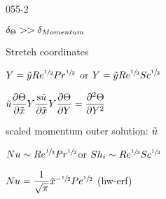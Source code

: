 \begin{mitframe}{055-2}
\begin{listone}
	\item $\blthick_{\dimltemp}>>\blthick_{Momentum}$
    \item Stretch coordinates
    	\begin{listtwo}
        	\item $Y=\tilde{y}\reynolds^{\sfrac{1}{2}}\prandtl^{\sfrac{1}{3}}$ or $Y=\tilde{y}\reynolds^{\sfrac{1}{3}}\schmidt^{\sfrac{1}{3}}$
            \item $\tilde{\forcepot}\dfrac{\partial\dimltemp}{\partial\tilde{\disp}}Y\dfrac{\mathrm{s}\tilde{\forcepot}}{\partial\tilde{\disp}}Y\dfrac{\partial\dimltemp}{\partial{Y}}=\dfrac{\partial^2\dimltemp}{\partial{Y}^2}$
            	\begin{listthree}
                	\item scaled momentum outer solution: $\tilde{\forcepot}$
                \end{listthree}
        \end{listtwo}
\item $\nusselt\sim\reynolds^{\sfrac{1}{3}}\prandtl^{\sfrac{1}{2}}$or $\sherwood_{\state}\sim\reynolds^{\sfrac{1}{3}}\schmidt^{\sfrac{1}{2}}$
\item $\nusselt=\dfrac{1}{\sqrt{\pi}}\tilde{\disp}^{-\sfrac{1}{2}}\peclet^{\sfrac{1}{2}}$ (hw-erf)


\end{listone}    
\end{mitframe}
